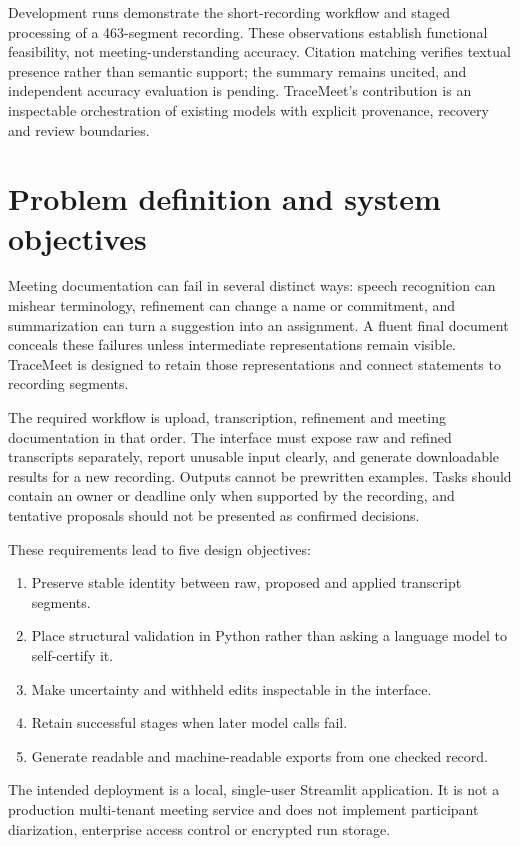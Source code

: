 \documentclass[11pt,a4paper]{article}
\begin{document}
Development runs demonstrate the short-recording workflow and staged processing of a 463-segment recording. These observations establish functional feasibility, not meeting-understanding accuracy. Citation matching verifies textual presence rather than semantic support; the summary remains uncited, and independent accuracy evaluation is pending. TraceMeet's contribution is an inspectable orchestration of existing models with explicit provenance, recovery and review boundaries.

\newpage
\tableofcontents
\newpage

\section{Problem definition and system objectives}
Meeting documentation can fail in several distinct ways: speech recognition can mishear terminology, refinement can change a name or commitment, and summarization can turn a suggestion into an assignment. A fluent final document conceals these failures unless intermediate representations remain visible. TraceMeet is designed to retain those representations and connect statements to recording segments.

The required workflow is upload, transcription, refinement and meeting documentation in that order. The interface must expose raw and refined transcripts separately, report unusable input clearly, and generate downloadable results for a new recording. Outputs cannot be prewritten examples. Tasks should contain an owner or deadline only when supported by the recording, and tentative proposals should not be presented as confirmed decisions.

These requirements lead to five design objectives:
\begin{enumerate}
\item Preserve stable identity between raw, proposed and applied transcript segments.
\item Place structural validation in Python rather than asking a language model to self-certify it.
\item Make uncertainty and withheld edits inspectable in the interface.
\item Retain successful stages when later model calls fail.
\item Generate readable and machine-readable exports from one checked record.
\end{enumerate}
The intended deployment is a local, single-user Streamlit application. It is not a production multi-tenant meeting service and does not implement participant diarization, enterprise access control or encrypted run storage.
\end{document}
